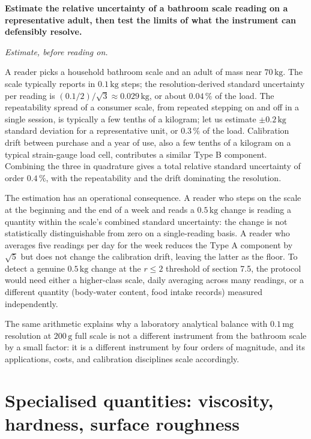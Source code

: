 \begin{estimation}
\textbf{Estimate the relative uncertainty of a bathroom scale
reading on a representative adult, then test the limits of what the
instrument can defensibly resolve.}

\smallskip
\textit{Estimate, before reading on.}

\smallskip
A reader picks a household bathroom scale and an adult of mass near
$70 \,\si{\kilogram}$. The scale typically reports in $0.1 \,\si
{\kilogram}$ steps; the resolution-derived standard uncertainty per
reading is $(0.1 / 2)/\sqrt{3} \approx 0.029 \,\si{\kilogram}$, or
about $0.04\,\%$ of the load. The repeatability spread of a
consumer scale, from repeated stepping on and off in a single
session, is typically a few tenths of a kilogram; let us estimate
$\pm 0.2 \,\si{\kilogram}$ standard deviation for a representative
unit, or $0.3\,\%$ of the load. Calibration drift between purchase
and a year of use, also a few tenths of a kilogram on a typical
strain-gauge load cell, contributes a similar Type B component.
Combining the three in quadrature gives a total relative standard
uncertainty of order $0.4\,\%$, with the repeatability and the
drift dominating the resolution.

\smallskip
The estimation has an operational consequence. A reader who steps
on the scale at the beginning and the end of a week and reads a
$0.5 \,\si{\kilogram}$ change is reading a quantity within the
scale's combined standard uncertainty: the change is not
statistically distinguishable from zero on a single-reading basis.
A reader who averages five readings per day for the week reduces
the Type A component by $\sqrt{5}$ but does not change the
calibration drift, leaving the latter as the floor. To detect a
genuine $0.5 \,\si{\kilogram}$ change at the $r \leq 2$ threshold
of section 7.5, the protocol would need either a higher-class
scale, daily averaging across many readings, or a different
quantity (body-water content, food intake records) measured
independently.

\smallskip
The same arithmetic explains why a laboratory analytical balance
with $0.1 \,\si{\milli\gram}$ resolution at $200 \,\si{\gram}$ full
scale is not a different instrument from the bathroom scale by a
small factor: it is a different instrument by four orders of
magnitude, and its applications, costs, and calibration disciplines
scale accordingly.
\end{estimation}

\section{Specialised quantities: viscosity, hardness, surface
roughness}

